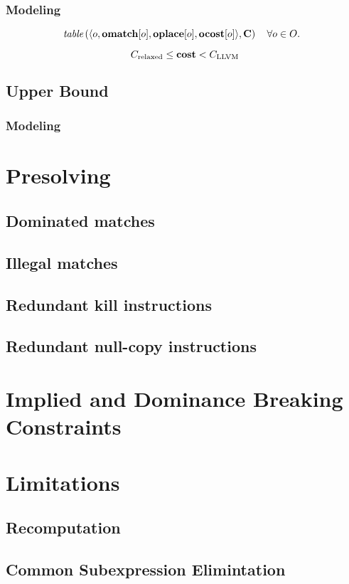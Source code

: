 \subsubsection{Modeling}

\begin{equation}
  \hspace*{-2mm} %
  \mTable\left(
    \langle
      o,
      \mVar{omatch}[o],
      \mVar{oplace}[o],
      \mVar{ocost}[o]
    \rangle,
    \mCostMatrix
  \right)
  \mQuantSep
  \forall o \in \mOpSet.
  \labelEquation{omatch-oplace-ocost-connection}
\end{equation}

\begin{equation}
  \mRelaxedCost \leq \mVar{cost} < \mLlvmCost
  \labelEquation{bounds}
\end{equation}

\subsection{Upper Bound}
\subsubsection{Modeling}

\section{Presolving}
\subsection{Dominated matches}
\subsection{Illegal matches}
\subsection{Redundant kill instructions}
\subsection{Redundant null-copy instructions}

\section{Implied and Dominance Breaking Constraints}

\section{Limitations}
\subsection{Recomputation}
\subsection{Common Subexpression Elimintation}

